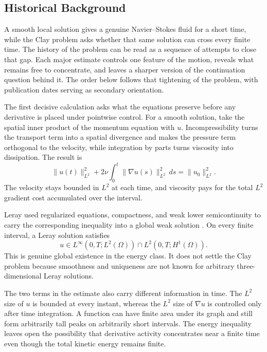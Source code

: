 \subsection{Historical Background}\label{sub:HistoricalEstimates}

A smooth local solution gives a genuine Navier--Stokes fluid for a short time, while the Clay problem asks whether that same solution can cross every finite time.
The history of the problem can be read as a sequence of attempts to close that gap.
Each major estimate controls one feature of the motion, reveals what remains free to concentrate, and leaves a sharper version of the continuation question behind it.
The order below follows that tightening of the problem, with publication dates serving as secondary orientation.


The first decisive calculation asks what the equations preserve before any derivative is placed under pointwise control.
For a smooth solution, take the spatial inner product of the momentum equation with \(u\).
Incompressibility turns the transport term into a spatial divergence and makes the pressure term orthogonal to the velocity, while integration by parts turns viscosity into dissipation.
The result is
\[
  \lVert u(t)\rVert_{L^2}^{2}
  +2\nu\int_0^t\lVert\nabla u(s)\rVert_{L^2}^{2}\,ds
  =
  \lVert u_0\rVert_{L^2}^{2}.
\]
The velocity stays bounded in \(L^2\) at each time, and viscosity pays for the total \(L^2\) gradient cost accumulated over the interval.

Leray used regularized equations, compactness, and weak lower semicontinuity to carry the corresponding inequality into a global weak solution \parencite{Leray1934}.
On every finite interval, a Leray solution satisfies
\[
  u\in L^\infty(0,T;L^2(\Omega))
  \cap
  L^2(0,T;H^1(\Omega)).
\]
This is genuine global existence in the energy class.
It does not settle the Clay problem because smoothness and uniqueness are not known for arbitrary three-dimensional Leray solutions.

The two terms in the estimate also carry different information in time.
The \(L^2\) size of \(u\) is bounded at every instant, whereas the \(L^2\) size of \(\nabla u\) is controlled only after time integration.
A function can have finite area under its graph and still form arbitrarily tall peaks on arbitrarily short intervals.
The energy inequality leaves open the possibility that derivative activity concentrates near a finite time even though the total kinetic energy remains finite.

